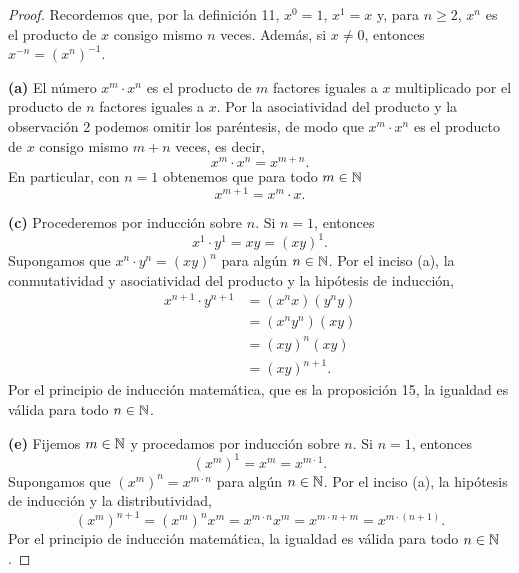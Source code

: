 \documentclass[12pt,a4paper]{article}
\begin{document}
    \begin{proof}
        Recordemos que, por la definición 11, $x^{0}=1$, $x^{1}=x$ y, para $n\geq2$, $x^{n}$ es el producto de $x$ consigo mismo $n$ veces. Además, si $x\neq0$, entonces $x^{-n}=\left(x^{n}\right)^{-1}$.

        \textbf{(a)} El número $x^{m}\cdot x^{n}$ es el producto de $m$ factores iguales a $x$ multiplicado por el producto de $n$ factores iguales a $x$. Por la asociatividad del producto y la observación 2 podemos omitir los paréntesis, de modo que $x^{m}\cdot x^{n}$ es el producto de $x$ consigo mismo $m+n$ veces, es decir,
        \begin{equation*}
            x^{m}\cdot x^{n}=x^{m+n}.
        \end{equation*}
        En particular, con $n=1$ obtenemos que para todo $m\in\mathbb{N}$
        \begin{equation*}
            x^{m+1}=x^{m}\cdot x.
        \end{equation*}

        \textbf{(c)} Procederemos por inducción sobre $n$. Si $n=1$, entonces
        \begin{equation*}
            x^{1}\cdot y^{1}=xy=(xy)^{1}.
        \end{equation*}
        Supongamos que $x^{n}\cdot y^{n}=(xy)^{n}$ para algún $n\in\mathbb{N}$. Por el inciso (a), la conmutatividad y asociatividad del producto y la hipótesis de inducción,
        \begin{align*}
            x^{n+1}\cdot y^{n+1}&=\left(x^{n}x\right)\left(y^{n}y\right)\\
            &=\left(x^{n}y^{n}\right)(xy)\\
            &=(xy)^{n}(xy)\\
            &=(xy)^{n+1}.
        \end{align*}
        Por el principio de inducción matemática, que es la proposición 15, la igualdad es válida para todo $n\in\mathbb{N}$.

        \textbf{(e)} Fijemos $m\in\mathbb{N}$ y procedamos por inducción sobre $n$. Si $n=1$, entonces
        \begin{equation*}
            \left(x^{m}\right)^{1}=x^{m}=x^{m\cdot1}.
        \end{equation*}
        Supongamos que $\left(x^{m}\right)^{n}=x^{m\cdot n}$ para algún $n\in\mathbb{N}$. Por el inciso (a), la hipótesis de inducción y la distributividad,
        \begin{equation*}
            \left(x^{m}\right)^{n+1}=\left(x^{m}\right)^{n}x^{m}=x^{m\cdot n}x^{m}=x^{m\cdot n+m}=x^{m\cdot(n+1)}.
        \end{equation*}
        Por el principio de inducción matemática, la igualdad es válida para todo $n\in\mathbb{N}$.


\end{proof}
\end{document}
